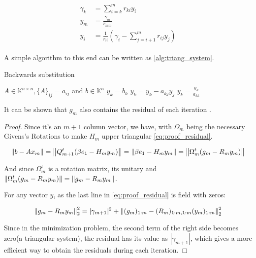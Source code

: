 \begin{align}\label{eq:triangular_system}
    \begin{split}
        \gamma_{k} &= \sum_{i=k}^{m} r_{ki} y_{i}\\
        y_{m} &= \frac{\gamma_{m}}{r_{mm}} \\
        y_{i} &= \frac{1}{r_{ii}} \left( \gamma_{i} - \sum_{j=i+1}^{m} r_{ij} y_{j}  \right)
    \end{split}
\end{align}

A simple algorithm to this end can be written as \ref{alg:triang_system}.

\begin{algorithm}
    \caption{Backwards substitution}\label{alg:triang_system}
    \begin{algorithmic}[1]
        \State $A \in \mathbb{K}^{n \times n}, \{ A \}_{ij} = a_{ij}$ and $b\in \mathbb{K}^{n}$
        \State $y_{k} = b_{k}$
        \State $y_{k} = y_{k} - a_{kj}y_{j}$
        \EndFor
        \State $y_{k} = \frac{y_{k}}{a_{kk}}$
        \EndFor
    \end{algorithmic}
\end{algorithm}



It can be shown that $g_{m}$ also contains the residual of each iteration \cite{saad2003iterative}.

\begin{proof}

    Since it's an $m+1$ column vector, we have, with $\Omega_{m}$ being the necessary Givens's Rotations to make $H_{m}$ upper triangular \ref{eq:proof_residual}.


    \begin{equation}\label{eq:proof_residual}
        \left\lVert b - Ax_{m}\right\rVert = \left\lVert Q_{m+1}^{t}(\beta e_{1} - H_{m}y_{m})\right\rVert = \left\lVert\beta e_{1} - H_{m}y_{m}\right\rVert = \left\lVert\Omega_{m}^{t} (g_{m} - R_{m}y_{m})\right\rVert
    \end{equation}

    And since $\Omega_{m}^{t}$ is a rotation matrix, its unitary and $\left\lVert\Omega_{m}^{t} (g_{m} - R_{m}y_{m})\right\rVert=\left\lVert g_{m} - R_{m}y_{m}\right\rVert$.

    For any vector $y$, as the last line in \ref{eq:proof_residual} is field with zeros:

    \begin{equation}
        \left\lVert g_{m} - R_{m}y_{m}\right\rVert_{2}^{2} = |\gamma_{m+1}|^{2} + \left\lVert(g_{m})_{1:m} - (R_{m})_{1:m,1:m} (y_{m})_{1:m}\right\rVert_{2}^{2}
    \end{equation}

    Since in the minimization problem, the second term of the right side becomes zero(a triangular system), the residual has its value as $|\gamma_{m+1}|$, which gives a more efficient way to obtain the residuals during each iteration.
\end{proof}

